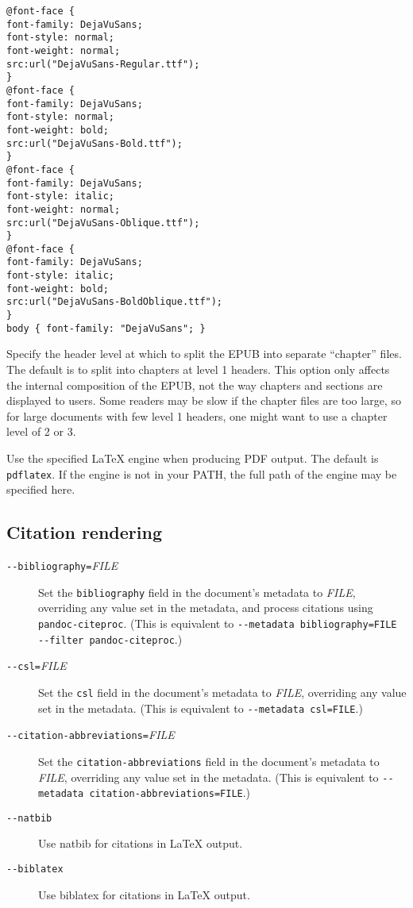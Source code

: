 \documentclass[]{article}
\begin{document}
\begin{description}
\begin{verbatim}
@font-face {
font-family: DejaVuSans;
font-style: normal;
font-weight: normal;
src:url("DejaVuSans-Regular.ttf");
}
@font-face {
font-family: DejaVuSans;
font-style: normal;
font-weight: bold;
src:url("DejaVuSans-Bold.ttf");
}
@font-face {
font-family: DejaVuSans;
font-style: italic;
font-weight: normal;
src:url("DejaVuSans-Oblique.ttf");
}
@font-face {
font-family: DejaVuSans;
font-style: italic;
font-weight: bold;
src:url("DejaVuSans-BoldOblique.ttf");
}
body { font-family: "DejaVuSans"; }
\end{verbatim}
\item[\texttt{-{}-epub-chapter-level=}\emph{NUMBER}]
Specify the header level at which to split the EPUB into separate
``chapter'' files. The default is to split into chapters at level 1
headers. This option only affects the internal composition of the EPUB,
not the way chapters and sections are displayed to users. Some readers
may be slow if the chapter files are too large, so for large documents
with few level 1 headers, one might want to use a chapter level of 2 or
3.
\item[\texttt{-{}-latex-engine=}\emph{pdflatex\textbar{}lualatex\textbar{}xelatex}]
Use the specified LaTeX engine when producing PDF output. The default is
\texttt{pdflatex}. If the engine is not in your PATH, the full path of
the engine may be specified here.
\end{description}

\subsection{Citation rendering}

\begin{description}
\item[\texttt{-{}-bibliography=}\emph{FILE}]
Set the \texttt{bibliography} field in the document's metadata to
\emph{FILE}, overriding any value set in the metadata, and process
citations using \texttt{pandoc-citeproc}. (This is equivalent to
\texttt{-{}-metadata bibliography=FILE -{}-filter pandoc-citeproc}.)
\item[\texttt{-{}-csl=}\emph{FILE}]
Set the \texttt{csl} field in the document's metadata to \emph{FILE},
overriding any value set in the metadata. (This is equivalent to
\texttt{-{}-metadata csl=FILE}.)
\item[\texttt{-{}-citation-abbreviations=}\emph{FILE}]
Set the \texttt{citation-abbreviations} field in the document's metadata
to \emph{FILE}, overriding any value set in the metadata. (This is
equivalent to \texttt{-{}-metadata citation-abbreviations=FILE}.)
\item[\texttt{-{}-natbib}]
Use natbib for citations in LaTeX output.
\item[\texttt{-{}-biblatex}]
Use biblatex for citations in LaTeX output.
\end{description}
\end{document}
